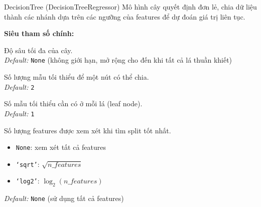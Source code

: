 \documentclass[12pt,a4paper]{article}
\newenvironment{methodlist}{
    \begin{description}[style=nextline, font=\ttfamily\color{sklearn-blue}]
}{
    \end{description}
}
\begin{document}
\begin{modelbox}{DecisionTree (DecisionTreeRegressor)}
Mô hình cây quyết định đơn lẻ, chia dữ liệu thành các nhánh dựa trên các ngưỡng của features để dự đoán giá trị liên tục.

\vspace{0.2cm}
\textbf{Siêu tham số chính:}
\begin{methodlist}
    \item[max\_depth] 
    Độ sâu tối đa của cây. \\ 
    \textit{Default:} \texttt{None} (không giới hạn, mở rộng cho đến khi tất cả lá thuần khiết)
    
    \item[min\_samples\_split] 
    Số lượng mẫu tối thiểu để một nút có thể chia. \\ 
    \textit{Default:} \texttt{2}
    
    \item[min\_samples\_leaf] 
    Số mẫu tối thiểu cần có ở mỗi lá (leaf node). \\ 
    \textit{Default:} \texttt{1}
    
    \item[max\_features] 
    Số lượng features được xem xét khi tìm split tốt nhất.
    \begin{itemize}[leftmargin=1.5em]
        \item \texttt{None}: xem xét tất cả features
        \item \texttt{`sqrt'}: $\sqrt{n\_features}$
        \item \texttt{`log2'}: $\log_2(n\_features)$
    \end{itemize}
    \textit{Default:} \texttt{None} (sử dụng tất cả features)
\end{methodlist}
\end{modelbox}
\end{document}
